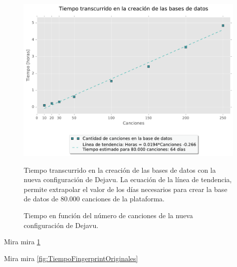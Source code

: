 \begin{figure}[h]
    \centering
    \includegraphics[scale=0.6]{graficos/ExtrapolarTiempoValoresConfiguracion.pdf}
    \caption{Tiempo en función del número de canciones de la nueva configuración de Dejavu.}{Tiempo transcurrido en la creación de las bases de datos con la nueva configuración de Dejavu. La ecuación de la línea de tendencia, permite extrapolar el valor de los días necesarios para crear la base de datos de 80.000 canciones de la plataforma.}
    \label{fig:ExtrapolarTiempoValoresConfiguracion}
\end{figure}
Mira mira \ref{fig:ExtrapolarTiempoValoresConfiguracion}


Mira mira \ref{fig:TiempoFingerprintOriginales}

